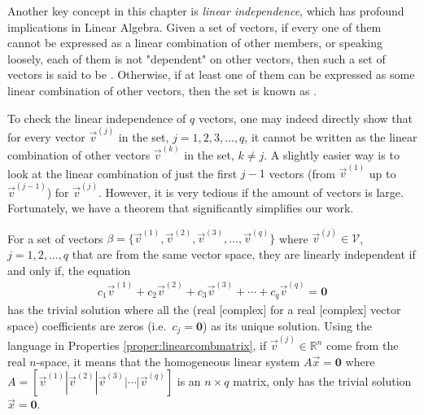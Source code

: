 Another key concept in this chapter is \textit{linear independence}, which has profound implications in Linear Algebra. Given a set of vectors, if every one of them cannot be expressed as a linear combination of other members, or speaking loosely, each of them is not "dependent" on other vectors, then such a set of vectors is said to be . Otherwise, if at least one of them can be expressed as some linear combination of other vectors, then the set is known as .\par
To check the linear independence of $q$ vectors, one may indeed directly show that for every vector $\vec{v}^{(j)}$ in the set, $j = 1,2,3,\ldots,q$, it cannot be written as the linear combination of other vectors $\vec{v}^{(k)}$ in the set, $k \neq j$. A slightly easier way is to look at the linear combination of just the first $j-1$ vectors (from $\vec{v}^{(1)}$ up to $\vec{v}^{(j-1)}$) for $\vec{v}^{(j)}$. However, it is very tedious if the amount of vectors is large. Fortunately, we have a theorem that significantly simplifies our work.
\begin{thm}
\label{thm:linearindep}
For a set of vectors $\mathcal{\beta} = \{\vec{v}^{(1)}, \vec{v}^{(2)}, \vec{v}^{(3)}, \ldots, \vec{v}^{(q)}\}$ where $\vec{v}^{(j)} \in \mathcal{V}$, $j=1,2,\ldots,q$ that are from the same vector space, they are linearly independent if and only if, the equation 
\begin{align}
c_1\vec{v}^{(1)} + c_2\vec{v}^{(2)} + c_3\vec{v}^{(3)} + \cdots + c_q\vec{v}^{(q)} = \textbf{0}    
\end{align}
has the trivial solution where all the (real [complex] for a real [complex] vector space) coefficients are zeros (i.e.\ $c_j = \textbf{0}$) as its unique solution. Using the language in Properties \ref{proper:linearcombmatrix}, if $\vec{v}^{(j)} \in \mathbb{R}^n$ come from the real $n$-space, it means that the homogeneous linear system $A\vec{x} = \textbf{0}$ where $A = [\vec{v}^{(1)}|\vec{v}^{(2)}|\vec{v}^{(3)}|\cdots|\vec{v}^{(q)}]$ is an $n \times q$ matrix, only has the trivial solution $\vec{x} = \textbf{0}$.
\end{thm}
